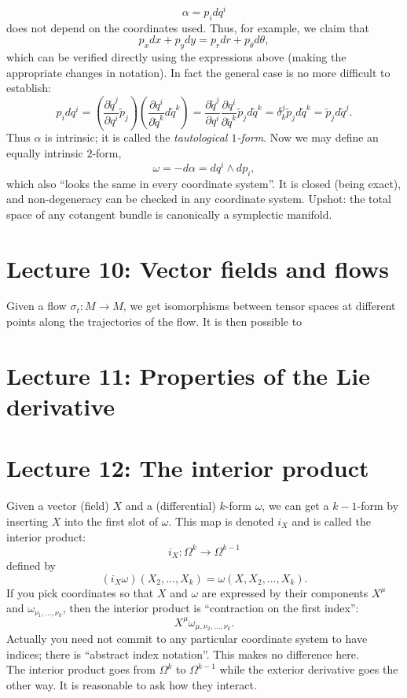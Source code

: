 \documentclass[11pt]{article} %
\begin{document}
$$
\alpha = p_i dq^i
$$
does not depend on the coordinates used. Thus, for example, we claim that
$$
p_x dx + p_ydy = p_r dr + p_\theta d\theta,
$$
which can be verified directly using the expressions above (making the appropriate changes in notation). In fact the general case is no more difficult to establish:
$$
p_i dq^i = \left(\frac{\partial \tilde{q}^j}{\partial q^i} \tilde{p}_j \right) \left( \frac{\partial q^i}{\partial \tilde{q}^k} d\tilde{q}^k\right) = \frac{\partial \tilde{q}^j}{\partial q^i} \frac{\partial q^i}{\partial \tilde{q}^k} \tilde{p}_j  d\tilde{q}^k = \delta ^j_k \tilde{p}_j  d\tilde{q}^k = \tilde{p}_j  d\tilde{q}^j.
$$
Thus $\alpha$ is intrinsic; it is called the \emph{tautological $1$-form}. Now we may define an equally intrinsic $2$-form,
$$
\omega = -d\alpha = dq^i \wedge dp_i,
$$
which also ``looks the same in every coordinate system''. It is closed (being exact), and non-degeneracy can be checked in any coordinate system. Upshot: the total space of any cotangent bundle is canonically a symplectic manifold. 
\section*{Lecture 10: Vector fields and flows}


Given a flow $\sigma_t: M\rightarrow M$, we get isomorphisms between tensor spaces at different points along the trajectories of the flow. It is then possible to 
\section*{Lecture 11: Properties of the Lie derivative}

\section*{Lecture 12: The interior product}
Given a vector (field) $X$ and a (differential) $k$-form $\omega$, we can get a $k-1$-form by inserting $X$ into the first slot of $\omega$. This map is denoted $i_X$ and is called the interior product:
$$
i_X: \Omega^k \rightarrow \Omega^{k-1}
$$
defined by 
$$
(i_X\omega)(X_2, \dots, X_k)= \omega(X, X_2, \dots, X_k).
$$
If you pick coordinates so that $X$ and $\omega$ are expressed by their components $X^\mu$ and $\omega_{\nu_1, \dots, \nu_k}$, then the interior product is ``contraction on the first index'':
$$
X^\mu \omega_{\mu, \nu_2, \dots, \nu_k}.
$$
Actually you need not commit to any particular coordinate system to have indices; there is ``abstract index notation''. This makes no difference here. \\
The interior product goes from $\Omega^k$ to $\Omega^{k-1}$ while the exterior derivative goes the other way. It is reasonable to ask how they interact. 
\end{document}
